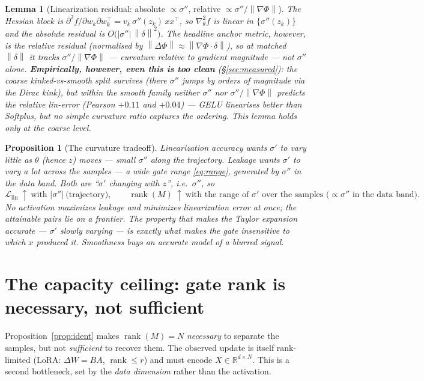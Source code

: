 \documentclass[11pt]{article}
\newtheorem{proposition}{Proposition}
\newtheorem{lemma}{Lemma}
\newcommand{\R}{\mathbb{R}}
\newcommand{\dW}{\Delta W}
\newcommand{\norm}[1]{\left\lVert #1 \right\rVert}
\newcommand{\rank}{\operatorname{rank}}
\begin{document}
\begin{lemma}[Linearization residual: absolute $\propto\sigma''$, relative $\propto\sigma''/\norm{\nabla\Phi}$]\label{lem:lin}
The Hessian block is $\partial^2 f/\partial w_k\partial w_k^\top=v_k\,\sigma''(z_k)\,x x^\top$, so
$\nabla^2_\theta f$ is linear in $\{\sigma''(z_k)\}$ and the \emph{absolute} residual is
$O\!\big(|\sigma''|\,\norm{\delta}^2\big)$. The headline anchor metric, however, is the \emph{relative}
residual (normalised by $\norm{\Delta\Phi}\approx\norm{\nabla\Phi\cdot\delta}$), so at matched
$\norm{\delta}$ it tracks $\sigma''/\norm{\nabla\Phi}$ --- curvature \emph{relative to} gradient
magnitude --- not $\sigma''$ alone. \textbf{Empirically, however, even this is too clean}
(\S\ref{sec:measured}): the coarse kinked-vs-smooth split survives (there $\sigma''$ jumps by orders of
magnitude via the Dirac kink), but \emph{within} the smooth family neither $\sigma''$ nor
$\sigma''/\norm{\nabla\Phi}$ predicts the relative lin-error (Pearson $+0.11$ and $+0.04$) --- GELU
linearises better than Softplus, but no simple curvature ratio captures the ordering. This lemma holds
only at the coarse level.
\end{lemma}

\begin{proposition}[The curvature tradeoff]\label{prop:tradeoff}
Linearization accuracy wants $\sigma'$ to vary \emph{little} as $\theta$ (hence $z$) moves ---
small $\sigma''$ along the trajectory. Leakage wants $\sigma'$ to vary \emph{a lot} \emph{across the
samples} --- a wide gate range \eqref{eq:range}, generated by $\sigma''$ in the data band. Both are
``$\sigma'$ changing with $z$'', i.e.\ $\sigma''$, so
\begin{equation}
  \mathcal L_{\mathrm{lin}}\ \uparrow\ \text{with }|\sigma''|\ \text{(trajectory)},
  \qquad
  \rank(M)\ \uparrow\ \text{with the range of }\sigma'\text{ over the samples (}\propto\sigma''\text{ in the data band)} .
\end{equation}
No activation maximizes leakage and minimizes linearization error at once; the attainable pairs lie on a
frontier. The property that makes the Taylor expansion accurate --- $\sigma'$ slowly varying --- is
exactly what makes the gate insensitive to \emph{which} $x$ produced it. Smoothness buys an accurate
model of a blurred signal.
\end{proposition}

\section{The capacity ceiling: gate rank is necessary, not sufficient}\label{sec:capacity}
Proposition~\ref{prop:ident} makes $\rank(M)=N$ \emph{necessary} to separate the samples, but not
\emph{sufficient} to recover them. The observed update is itself rank-limited (LoRA: $\dW=BA$,
$\rank\le r$) and must encode $X\in\R^{d\times N}$. This is a second bottleneck, set by the
\emph{data dimension} rather than the activation.
\end{document}
